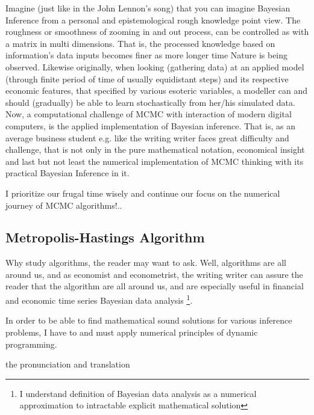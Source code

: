 \documentclass[a4paper,11pt,english]{article}
\begin{document}
		Imagine (just like in the John Lennon's song) that you can imagine Bayesian Inference from a personal and epistemological rough knowledge point 
		view. The roughness or smoothness of zooming in and out process, can be controlled as with a matrix in multi dimensions. That is, the processed 
		knowledge based on information's data inputs becomes finer as more longer time Nature is being observed. Likewise originally, when looking 
		(gathering data) at an applied model (through finite period of time of usually equidistant steps) and its respective economic features, that 
		specified by various esoteric variables, a modeller can and should (gradually) be able to learn stochastically from her/his simulated data. Now, a 
		computational challenge of MCMC with interaction of modern digital computers, is the applied implementation of Bayesian inference. That is, as an 
		average business student e.g. like the writing writer faces great difficulty and challenge, that is not only in the pure mathematical notation, 
		economical insight and last but not least the numerical implementation of MCMC thinking with its practical Bayesian Inference in it.
				
		I prioritize our frugal time wisely and continue our focus on the numerical journey of MCMC algorithms!..
				
		\subsection{Metropolis-Hastings Algorithm}

		Why study algorithms, the reader may want to ask. Well, algorithms are all around us, and as economist and econometrist, the writing writer 
		can assure the reader that the algorithm are all around us, and are especially useful in financial and economic time series Bayesian data analysis
		\footnote{I understand definition of Bayesian data analysis as a numerical approximation to intractable explicit mathematical solution}.
		
		In order to be able to find mathematical sound solutions for various inference problems, I have to and must apply numerical principles of dynamic 
		programming.

the pronunciation and translation
			
\end{document}
